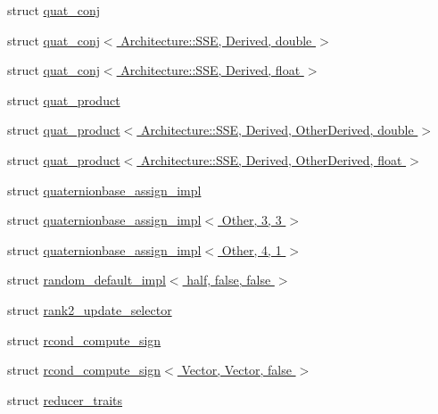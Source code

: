 \begin{DoxyCompactItemize}
\item 
struct \hyperlink{struct_eigen_1_1internal_1_1quat__conj}{quat\+\_\+conj}
\item 
struct \hyperlink{struct_eigen_1_1internal_1_1quat__conj_3_01_architecture_1_1_s_s_e_00_01_derived_00_01double_01_4}{quat\+\_\+conj$<$ Architecture\+::\+S\+S\+E, Derived, double $>$}
\item 
struct \hyperlink{struct_eigen_1_1internal_1_1quat__conj_3_01_architecture_1_1_s_s_e_00_01_derived_00_01float_01_4}{quat\+\_\+conj$<$ Architecture\+::\+S\+S\+E, Derived, float $>$}
\item 
struct \hyperlink{struct_eigen_1_1internal_1_1quat__product}{quat\+\_\+product}
\item 
struct \hyperlink{struct_eigen_1_1internal_1_1quat__product_3_01_architecture_1_1_s_s_e_00_01_derived_00_01_other_derived_00_01double_01_4}{quat\+\_\+product$<$ Architecture\+::\+S\+S\+E, Derived, Other\+Derived, double $>$}
\item 
struct \hyperlink{struct_eigen_1_1internal_1_1quat__product_3_01_architecture_1_1_s_s_e_00_01_derived_00_01_other_derived_00_01float_01_4}{quat\+\_\+product$<$ Architecture\+::\+S\+S\+E, Derived, Other\+Derived, float $>$}
\item 
struct \hyperlink{struct_eigen_1_1internal_1_1quaternionbase__assign__impl}{quaternionbase\+\_\+assign\+\_\+impl}
\item 
struct \hyperlink{struct_eigen_1_1internal_1_1quaternionbase__assign__impl_3_01_other_00_013_00_013_01_4}{quaternionbase\+\_\+assign\+\_\+impl$<$ Other, 3, 3 $>$}
\item 
struct \hyperlink{struct_eigen_1_1internal_1_1quaternionbase__assign__impl_3_01_other_00_014_00_011_01_4}{quaternionbase\+\_\+assign\+\_\+impl$<$ Other, 4, 1 $>$}
\item 
struct \hyperlink{struct_eigen_1_1internal_1_1random__default__impl_3_01half_00_01false_00_01false_01_4}{random\+\_\+default\+\_\+impl$<$ half, false, false $>$}
\item 
struct \hyperlink{struct_eigen_1_1internal_1_1rank2__update__selector}{rank2\+\_\+update\+\_\+selector}
\item 
struct \hyperlink{struct_eigen_1_1internal_1_1rcond__compute__sign}{rcond\+\_\+compute\+\_\+sign}
\item 
struct \hyperlink{struct_eigen_1_1internal_1_1rcond__compute__sign_3_01_vector_00_01_vector_00_01false_01_4}{rcond\+\_\+compute\+\_\+sign$<$ Vector, Vector, false $>$}
\item 
struct \hyperlink{struct_eigen_1_1internal_1_1reducer__traits}{reducer\+\_\+traits}

\end{DoxyCompactItemize}
